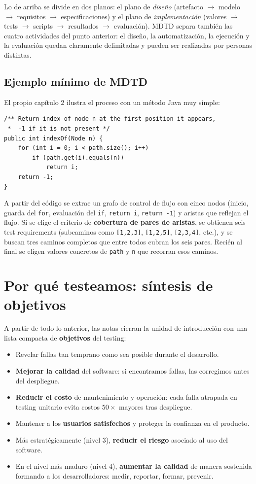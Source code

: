 \documentclass[12pt,a4paper]{article}
\begin{document}
Lo de arriba se divide en dos planos: el plano de \textit{diseño} (artefacto $\to$ modelo $\to$ requisitos $\to$ especificaciones) y el plano de \textit{implementación} (valores $\to$ tests $\to$ scripts $\to$ resultados $\to$ evaluación). MDTD separa también las cuatro actividades del punto anterior: el diseño, la automatización, la ejecución y la evaluación quedan claramente delimitadas y pueden ser realizadas por personas distintas.

\subsection{Ejemplo mínimo de MDTD}
El propio capítulo 2 ilustra el proceso con un método Java muy simple:
\begin{lstlisting}[style=javastyle]
/** Return index of node n at the first position it appears,
 *  -1 if it is not present */
public int indexOf(Node n) {
    for (int i = 0; i < path.size(); i++)
        if (path.get(i).equals(n))
            return i;
    return -1;
}
\end{lstlisting}
A partir del código se extrae un grafo de control de flujo con cinco nodos (inicio, guarda del \texttt{for}, evaluación del \texttt{if}, \texttt{return i}, \texttt{return -1}) y aristas que reflejan el flujo. Si se elige el criterio de \textbf{cobertura de pares de aristas}, se obtienen seis test requirements (subcaminos como \texttt{[1,2,3]}, \texttt{[1,2,5]}, \texttt{[2,3,4]}, etc.), y se buscan tres caminos completos que entre todos cubran los seis pares. Recién al final se eligen valores concretos de \texttt{path} y \texttt{n} que recorran esos caminos.

\section{Por qué testeamos: síntesis de objetivos}
A partir de todo lo anterior, las notas cierran la unidad de introducción con una lista compacta de \textbf{objetivos} del testing:

\begin{itemize}
  \item Revelar fallas tan temprano como sea posible durante el desarrollo.
  \item \textbf{Mejorar la calidad} del software: si encontramos fallas, las corregimos antes del despliegue.
  \item \textbf{Reducir el costo} de mantenimiento y operación: cada falla atrapada en testing unitario evita costos $50\times$ mayores tras despliegue.
  \item Mantener a los \textbf{usuarios satisfechos} y proteger la confianza en el producto.
  \item Más estratégicamente (nivel 3), \textbf{reducir el riesgo} asociado al uso del software.
  \item En el nivel más maduro (nivel 4), \textbf{aumentar la calidad} de manera sostenida formando a los desarrolladores: medir, reportar, formar, prevenir.
\end{itemize}
\end{document}
